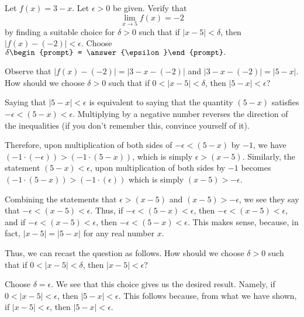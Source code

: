 \documentclass{ximera}
\author{Gregory Hartman \and Matthew Carr}
\begin{document}
\begin{exercise}



Let $f(x)=3-x$. Let $\epsilon>0$ be given. Verify that
\[
\lim_{x\to5}f(x)=-2
\]
by finding a suitable choice for $\delta>0$ such that if $\left|{x-5}\right|<\delta$, then $\left|{f(x)-({-2})}\right|<\epsilon$. Choose $\delta\begin{prompt} = \answer{\epsilon}\end{prompt}.$

 \begin{hint}
 Observe that $\left|{f(x)-({-2})}\right|=\left|{3-x-({-2})}\right|$ and $\left|{3-x-({-2})}\right|=\left|{5-x}\right|$. How should we choose $\delta>0$ such that if $0<\left|{x-5}\right|<\delta$, then $\left|{5-x}\right|<\epsilon$?
 \end{hint}
 \begin{hint}
 Saying that $\left|{5-x}\right|<\epsilon$ is equivalent to saying that the quantity $\left({5-x}\right)$ satisfies $-\epsilon<\left({5-x}\right)<\epsilon$. Multiplying by a negative number reverses the direction of the inequalities (if you don't remember this, convince yourself of it).
 
 Therefore, upon multiplication of both sides of $-\epsilon<\left({5-x}\right)$ by $-1$, we have $\left({-1\cdot\left({-\epsilon}\right)}\right)>\left({-1\cdot\left({5-x}\right)}\right)$, which is simply $\epsilon>\left({x-5}\right)$. Similarly, the statement $\left({5-x}\right)<\epsilon$, upon multiplication of both sides by $-1$ becomes $\left({-1\cdot\left({5-x}\right)}\right)>\left({-1\cdot\left({\epsilon}\right)}\right)$ which is simply $\left({x-5}\right)>-\epsilon$.
 \end{hint}
 \begin{hint}
 Combining the statements that $\epsilon>\left({x-5}\right)$ and $\left({x-5}\right)>-\epsilon$, we see they say that $-\epsilon<\left({x-5}\right)<\epsilon$. Thus, if $-\epsilon<\left({5-x}\right)<\epsilon$, then $-\epsilon<\left({x-5}\right)<\epsilon$, and if $-\epsilon<\left({x-5}\right)<\epsilon$, then $-\epsilon<\left({5-x}\right)<\epsilon$. This makes sense, because, in fact, $\left|{x-5}\right|=\left|{5-x}\right|$ for any real number $x$. 
 
 Thus, we can recast the question as follows. How should we choose $\delta>0$ such that if $0<\left|{x-5}\right|<\delta$, then $\left|{x-5}\right|<\epsilon$?
 \end{hint}
 \begin{hint}
 Choose $\delta=\epsilon$. We see that this choice gives us the desired result. Namely, if $0<\left|{x-5}\right|<\epsilon$, then $\left|{5-x}\right|<\epsilon$. This follows because, from what we have shown, if $\left|{x-5}\right|<\epsilon$, then $\left|{5-x}\right|<\epsilon$.
 \end{hint}
\end{exercise}
\end{document}
